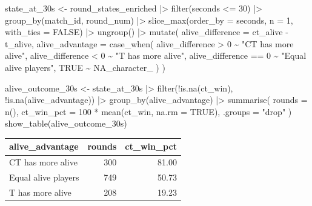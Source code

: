 \documentclass[
  letterpaper,
  DIV=11,
  numbers=noendperiod]{scrartcl}
\newenvironment{Shaded}{\begin{snugshade}}{\end{snugshade}}
\newcommand{\AttributeTok}[1]{\textcolor[rgb]{0.40,0.45,0.13}{#1}}
\newcommand{\ConstantTok}[1]{\textcolor[rgb]{0.56,0.35,0.01}{#1}}
\newcommand{\DecValTok}[1]{\textcolor[rgb]{0.68,0.00,0.00}{#1}}
\newcommand{\FunctionTok}[1]{\textcolor[rgb]{0.28,0.35,0.67}{#1}}
\newcommand{\NormalTok}[1]{\textcolor[rgb]{0.00,0.23,0.31}{#1}}
\newcommand{\OtherTok}[1]{\textcolor[rgb]{0.00,0.23,0.31}{#1}}
\newcommand{\SpecialCharTok}[1]{\textcolor[rgb]{0.37,0.37,0.37}{#1}}
\newcommand{\StringTok}[1]{\textcolor[rgb]{0.13,0.47,0.30}{#1}}
\newcounter{none} %
\begin{document}
\begin{Shaded}
\begin{Highlighting}[]
\NormalTok{state\_at\_30s }\OtherTok{\textless{}{-}}\NormalTok{ round\_states\_enriched }\SpecialCharTok{|\textgreater{}}
  \FunctionTok{filter}\NormalTok{(seconds }\SpecialCharTok{\textless{}=} \DecValTok{30}\NormalTok{) }\SpecialCharTok{|\textgreater{}}
  \FunctionTok{group\_by}\NormalTok{(match\_id, round\_num) }\SpecialCharTok{|\textgreater{}}
  \FunctionTok{slice\_max}\NormalTok{(}\AttributeTok{order\_by =}\NormalTok{ seconds, }\AttributeTok{n =} \DecValTok{1}\NormalTok{, }\AttributeTok{with\_ties =} \ConstantTok{FALSE}\NormalTok{) }\SpecialCharTok{|\textgreater{}}
  \FunctionTok{ungroup}\NormalTok{() }\SpecialCharTok{|\textgreater{}}
  \FunctionTok{mutate}\NormalTok{(}
    \AttributeTok{alive\_difference =}\NormalTok{ ct\_alive }\SpecialCharTok{{-}}\NormalTok{ t\_alive,}
    \AttributeTok{alive\_advantage =} \FunctionTok{case\_when}\NormalTok{(}
\NormalTok{      alive\_difference }\SpecialCharTok{\textgreater{}} \DecValTok{0} \SpecialCharTok{\textasciitilde{}} \StringTok{"CT has more alive"}\NormalTok{,}
\NormalTok{      alive\_difference }\SpecialCharTok{\textless{}} \DecValTok{0} \SpecialCharTok{\textasciitilde{}} \StringTok{"T has more alive"}\NormalTok{,}
\NormalTok{      alive\_difference }\SpecialCharTok{==} \DecValTok{0} \SpecialCharTok{\textasciitilde{}} \StringTok{"Equal alive players"}\NormalTok{,}
      \ConstantTok{TRUE} \SpecialCharTok{\textasciitilde{}} \ConstantTok{NA\_character\_}
\NormalTok{    )}
\NormalTok{  )}

\NormalTok{alive\_outcome\_30s }\OtherTok{\textless{}{-}}\NormalTok{ state\_at\_30s }\SpecialCharTok{|\textgreater{}}
  \FunctionTok{filter}\NormalTok{(}\SpecialCharTok{!}\FunctionTok{is.na}\NormalTok{(ct\_win), }\SpecialCharTok{!}\FunctionTok{is.na}\NormalTok{(alive\_advantage)) }\SpecialCharTok{|\textgreater{}}
  \FunctionTok{group\_by}\NormalTok{(alive\_advantage) }\SpecialCharTok{|\textgreater{}}
  \FunctionTok{summarise}\NormalTok{(}
    \AttributeTok{rounds =} \FunctionTok{n}\NormalTok{(),}
    \AttributeTok{ct\_win\_pct =} \DecValTok{100} \SpecialCharTok{*} \FunctionTok{mean}\NormalTok{(ct\_win, }\AttributeTok{na.rm =} \ConstantTok{TRUE}\NormalTok{),}
    \AttributeTok{.groups =} \StringTok{"drop"}
\NormalTok{  )}
\FunctionTok{show\_table}\NormalTok{(alive\_outcome\_30s)}
\end{Highlighting}
\end{Shaded}

{\def\LTcaptype{none} %
\begin{longtable}[]{@{}lrr@{}}
\toprule\noalign{}
alive\_advantage & rounds & ct\_win\_pct \\
\midrule\noalign{}
\endhead
\bottomrule\noalign{}
\endlastfoot
CT has more alive & 300 & 81.00 \\
Equal alive players & 749 & 50.73 \\
T has more alive & 208 & 19.23 \\
\end{longtable}
}
\end{document}

